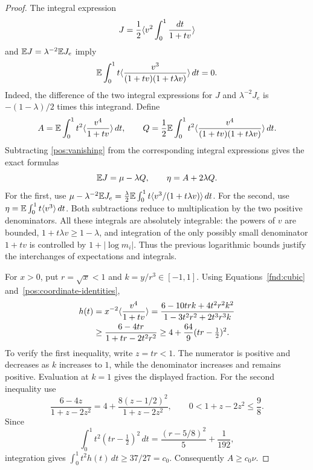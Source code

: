 \begin{proof}
The integral expression
\[
 J=\frac12\langle v^2\int_0^1\frac{dt}{1+tv}\rangle
\]
and \(\mathbb E J=\lambda^{-2}\mathbb E J_e\) imply
\begin{equation}\label{pos:vanishing}
 \mathbb E\int_0^1t\langle \frac{v^3}{(1+tv)(1+t\lambda v)}\rangle\,dt=0.
\end{equation}
Indeed, the difference of the two integral expressions for \(J\) and
\(\lambda^{-2}J_e\) is \(-(1-\lambda)/2\) times this integrand.
Define
\[
 A=\mathbb E\int_0^1t^2\langle \frac{v^4}{1+tv}\rangle\,dt,
 \qquad
 Q=\frac12\mathbb E\int_0^1t^2
       \langle \frac{v^4}{(1+tv)(1+t\lambda v)}\rangle\,dt.
\]
Subtracting \eqref{pos:vanishing} from the corresponding integral
expressions gives the exact formulas
\begin{equation}\label{pos:Q-identities}
 \mathbb E J=\mu-\lambda Q,\qquad \eta=A+2\lambda Q.
\end{equation}
For the first, use
\(\mu-\lambda^{-2}\mathbb E J_e
 =\frac\lambda2\mathbb E\int_0^1 t\langle v^3/(1+t\lambda v)\rangle\,dt\).
For the second, use
\(\eta=\mathbb E\int_0^1t\langle v^3\rangle\,dt\).
Both subtractions reduce to multiplication by the two positive
denominators. All these integrals are absolutely integrable: the powers
of \(v\) are bounded, \(1+t\lambda v\ge1-\lambda\), and integration of
the only possibly small denominator \(1+tv\) is controlled by
\(1+|\log m_i|\). Thus the previous logarithmic bounds justify the
interchanges of expectations and integrals.

For \(x>0\), put \(r=\sqrt{x}<1\) and \(k=y/r^3\in[-1,1]\).
Using Equations~\eqref{fnd:cubic} and~\eqref{pos:coordinate-identities},
\begin{equation}\label{pos:h-bound}
 \begin{split}
 h(t)&=x^{-2}\langle \frac{v^4}{1+tv}\rangle
   =\frac{6-10tr k+4t^2r^2k^2}{1-3t^2r^2+2t^3r^3k}\\
 &\ge\frac{6-4tr}{1+tr-2t^2r^2}
  \ge4+\frac{64}{9}(tr-\tfrac12)^2.
 \end{split}
\end{equation}
To verify the first inequality, write \(z=tr<1\). The numerator is
positive and decreases as \(k\) increases to \(1\), while the denominator
increases and remains positive. Evaluation at \(k=1\) gives the displayed
fraction. For the second inequality use
\[
 \frac{6-4z}{1+z-2z^2}
   =4+\frac{8(z-1/2)^2}{1+z-2z^2},\qquad
 0<1+z-2z^2\le\frac98.
\]
Since
\[
 \int_0^1t^2(tr-\tfrac12)^2\,dt
   =\frac{(r-5/8)^2}{5}+\frac1{192},
\]
integration gives \(\int_0^1t^2h(t)\,dt\ge37/27=c_0\).
Consequently \(A\ge c_0\nu\).


\end{proof}
